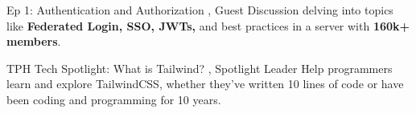 

\begin{cventries}


\cventrynoposition
    {Ep 1: Authentication and Authorization} %
    {, Guest}
    {}
    {Discussion delving into topics like \textbf{Federated Login, SSO, JWTs,} and best practices in a server with \textbf{160k+ members}.}

\cventrynoposition
    {TPH Tech Spotlight: What is Tailwind?} %
    {, Spotlight Leader}
    {}
    {Help programmers learn and explore TailwindCSS, whether they've written 10 lines of code or have been coding and programming for 10 years.}


\end{cventries}
